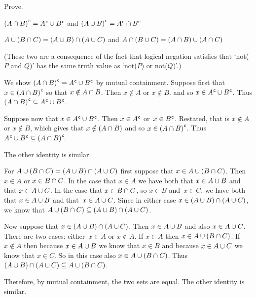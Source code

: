 \documentclass{test}  %
\begin{document}
\begin{ex}  Prove.
\begin{exes}
\item 
  ${(A\cap B)}^{\mspace{1mu}\mathsf{c}}={A}^{\mspace{1mu}\mathsf{c}}\cup{B}^{\mspace{1mu}\mathsf{c}}$
  and
  ${(A\cup B)}^{\mspace{1mu}\mathsf{c}}={A}^{\mspace{1mu}\mathsf{c}}\cap{B}^{\mspace{1mu}\mathsf{c}}$ 
\item {} 
$A\cup (B\cap C)=(A\cup B)\cap (A\cup C)$
 and $A\cap (B\cup C)=(A\cap B)\cup (A\cap C)$
\end{exes}
\begin{ans}
\begin{exes}
\item (These two are a consequence of the fact that logical negation
  satisfies that `not($P$ and $Q$)' has the same truth value as
  `not($P$) or not($Q$)'.)

  We show  ${(A\cap B)}^{\mspace{1mu}\mathsf{c}}={A}^{\mspace{1mu}\mathsf{c}}\cup{B}^{\mspace{1mu}\mathsf{c}}$
  by mutual containment.
  Suppose first that $x\in {(A\cap B)}^{\mspace{1mu}\mathsf{c}}$ so that
  $x\notin A\cap B$.
  Then $x\notin A$ or $x\notin B$.
  and so $x\in {A}^{\mspace{1mu}\mathsf{c}}\cup{B}^{\mspace{1mu}\mathsf{c}}$.
  Thus ${(A\cap B)}^{\mspace{1mu}\mathsf{c}}\subseteq{A}^{\mspace{1mu}\mathsf{c}}\cup{B}^{\mspace{1mu}\mathsf{c}}$.

  Suppose now that $x\in {A}^{\mspace{1mu}\mathsf{c}}\cup{B}^{\mspace{1mu}\mathsf{c}}$.
  Then $x\in{A}^{\mspace{1mu}\mathsf{c}}$ or~$x\in{B}^{\mspace{1mu}\mathsf{c}}$.
  Restated, that is $x\notin A$ or $x\notin B$,
  which gives that $x\notin (A\cap B)$ and
  so $x\in{(A\cap B)}^{\mspace{1mu}\mathsf{c}}$.
  Thus ${A}^{\mspace{1mu}\mathsf{c}}\cup{B}^{\mspace{1mu}\mathsf{c}}\subseteq{(A\cap B)}^{\mspace{1mu}\mathsf{c}}$.
  
  The other identity is similar.
\item For $A\cup (B\cap C)=(A\cup B)\cap (A\cup C)$
  first suppose that $x\in A\cup (B\cap C)$.
  Then $x\in A$ or $x\in B\cap C$.
  In the case that $x\in A$ we have both that $x\in A\cup B$ and that
  $x\in A\cup C$.
  In the case that $x\in B\cap C$, so $x\in B$ and~$x\in C$, 
  we have both that $x\in A\cup B$ and that~$x\in A\cup C$.
  Since in either case $x\in (A\cup B)\cap (A\cup C)$,
  we know that 
  $A\cup (B\cap C)\subseteq (A\cup B)\cap (A\cup C)$.

  Now suppose that $x\in (A\cup B)\cap (A\cup C)$.
  Then $x\in A\cup B$ and also $x\in A\cup C$.
  There are two cases: either~$x\in A$ or $x\notin A$.
  If $x\in A$ then $x\in A\cup (B\cap C)$.
  If $x\notin A$ then because $x\in A\cup B$ we know that $x\in B$
  and because $x\in A\cup C$ we know that $x\in C$.
  So in this case also $x\in A\cup (B\cap C)$.
  Thus 
  $(A\cup B)\cap (A\cup C)\subseteq A\cup (B\cap C)$.

  Therefore, by mutual containment, the two sets are equal.
  The other identity is similar.
\end{exes}
\end{ans}
\end{ex}
\end{document}
